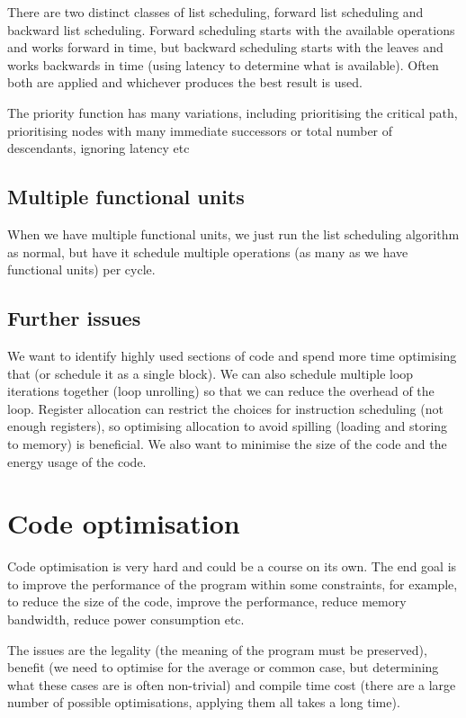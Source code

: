 There are two distinct classes of list scheduling, forward list
scheduling and backward list scheduling. Forward scheduling starts
with the available operations and works forward in time, but backward
scheduling starts with the leaves and works backwards in time (using
latency to determine what is available). Often both are applied and
whichever produces the best result is used.

The priority function has many variations, including prioritising the
critical path, prioritising nodes with many immediate successors or
total number of descendants, ignoring latency etc

\subsection{Multiple functional units}

When we have multiple functional units, we just run the list
scheduling algorithm as normal, but have it schedule multiple
operations (as many as we have functional units) per cycle.


\subsection{Further issues}

We want to identify highly used sections of code and spend more time
optimising that (or schedule it as a single block). We can also
schedule multiple loop iterations together (loop unrolling) so that we
can reduce the overhead of the loop. Register allocation can restrict
the choices for instruction scheduling (not enough registers), so
optimising allocation to avoid spilling (loading and storing to
memory) is beneficial. We also want to minimise the size of the code
and the energy usage of the code.


\section{Code optimisation}

Code optimisation is very hard and could be a course on its own. The
end goal is to improve the performance of the program within some
constraints, for example, to reduce the size of the code, improve the
performance, reduce memory bandwidth, reduce power consumption etc.

The issues are the legality (the meaning of the program must be
preserved), benefit (we need to optimise for the average or common
case, but determining what these cases are is often non-trivial) and
compile time cost (there are a large number of possible optimisations,
applying them all takes a long time).


